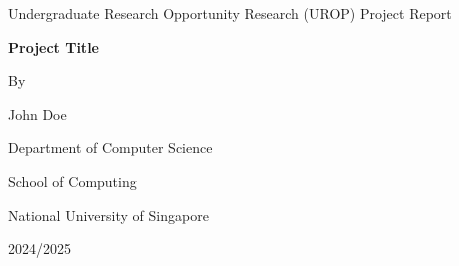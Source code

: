 \begin{titlepage}
    \centering
    {\large Undergraduate Research Opportunity Research (UROP) Project Report}
    \vfill
    {\LARGE\bfseries Project Title\par}
    \vspace{2cm}
    {\large By\par John Doe}
    \vfill
    Department of Computer Science\par
    School of Computing\par
    National University of Singapore\par
    \vspace{1cm}
    {\normalsize 2024/2025\par}
\end{titlepage}
\restoregeometry
\pagebreak
